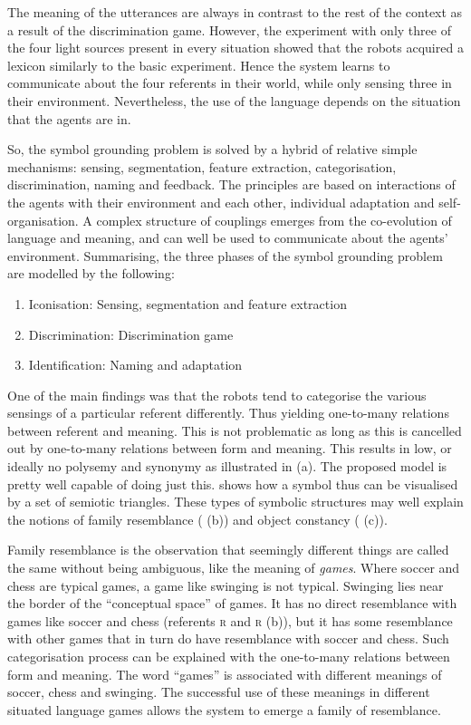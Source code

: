The meaning of the utterances are always in contrast to the rest of the context as a result of the discrimination game. However, the experiment with only three of the four light sources present in every situation showed that the robots acquired a lexicon similarly to the basic experiment. Hence the system learns to communicate about the four referents in their world, while only sensing three in their environment. Nevertheless, the use of the language depends on the situation that the agents are in.

So, the symbol grounding problem is solved by a hybrid of relative simple mechanisms: sensing, segmentation, feature extraction, categorisation, discrimination, naming and feedback. The principles are based on interactions of the agents with their environment and each other, individual adaptation and self-organisation. A complex structure of couplings emerges from the co-evolution of language and meaning, and can well be used to communicate about the agents' environment. Summarising, the three phases of the symbol grounding problem are modelled by the following:

\begin{enumerate}
\item {Iconisation:} Sensing, segmentation and feature extraction
\item {Discrimination:} Discrimination game
\item {Identification:} Naming and adaptation
\end{enumerate}

One of the main findings was that the robots tend to categorise the various sensings of a particular referent differently. Thus yielding one-to-many relations between referent and meaning. This is not problematic as long as this is cancelled out by one-to-many relations between form and meaning. This results in low, or ideally no polysemy and synonymy as illustrated in  (a). The proposed model is pretty well capable of doing just this.  shows how a symbol thus can be visualised by a set of semiotic triangles. These types of symbolic structures may well explain the notions of family resemblance ( (b)) and object constancy ( (c)).

 Family resemblance \citep{wittgenstein:1958} is the observation that seemingly different things are called the same without being ambiguous, like the meaning of {\it games}. Where soccer and chess are typical games, a game like swinging is not typical. Swinging lies near the border of the ``conceptual space'' of games. It has no direct resemblance with games like soccer  and chess (referents \textsc{r} and \textsc{r}  (b)), but it has some resemblance with other games that in turn do have resemblance with soccer and chess. Such categorisation process can be explained with the one-to-many relations between form and meaning. The word ``games'' is associated with different meanings of soccer, chess and swinging. The successful use of these meanings in different situated language games allows the system to emerge a family of resemblance.


